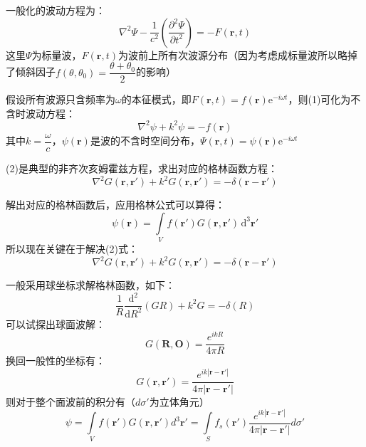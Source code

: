 \documentclass[10pt]{beamer}
\renewcommand{\bm}{\symbf}
\newenvironment{slide}{
    \begin{frame}{\bfseries{\sectiontitle}}
}{
    \end{frame}
}
\begin{document}
\begin{slide}
    一般化的波动方程为：
    \begin{equation}
        \nabla^2 \varPsi - \frac{1}{c^2}\left(\frac{\partial^2 \varPsi}{\partial t^2}\right) = -F(\bm{r},t)
    \end{equation}
    这里$\varPsi$为标量波，$F(\bm{r},t)$为波前上所有次波源分布（因为考虑成标量波所以略掉了倾斜因子$f(\theta,\theta_0)=\dfrac{\theta+\theta_0}{2}$的影响）

    假设所有波源只含频率为$\omega$的本征模式，即$F(\bm{r},t)=f(\bm{r})\mathrm{e}^{-i\omega t}$，则(1)可化为不含时波动方程：
    \begin{equation}
        \nabla^2 \psi + k^2 \psi = -f(\bm{r})
    \end{equation}
    其中$k=\dfrac{\omega}{c}$，$\psi(\bm{r})$是波的不含时空间分布，$\varPsi(\bm{r},t)=\psi(\bm{r})\mathrm{e}^{-i\omega t}$
\end{slide}

\begin{slide}
    (2)是典型的非齐次亥姆霍兹方程，求出对应的格林函数方程：
    \begin{equation}
        \nabla^2 G(\bm{r},\bm{r}') + k^2 G(\bm{r},\bm{r}') = -\delta(\bm{r}-\bm{r}')
    \end{equation}

    解出对应的格林函数后，应用格林公式可以算得：
    \begin{equation}
        \psi(\bm{r}) = \int\limits_{V} f(\bm{r}')G(\bm{r},\bm{r}')\,\mathrm{d}^3\bm{r}'
    \end{equation}
    所以现在关键在于解决(2)式：
    \begin{equation*}
        \nabla^2 G(\bm{r},\bm{r}') + k^2 G(\bm{r},\bm{r}') = -\delta(\bm{r}-\bm{r}')
    \end{equation*}
\end{slide}

\begin{slide}
    一般采用球坐标求解格林函数，如下：
    \begin{equation}
        \frac{1}{R} \frac{\mathrm{d}^2}{\mathrm{d} R^2} (GR) +k^2 G
        = -\delta(R)
    \end{equation}
    可以试探出球面波解：
    \begin{equation}
        G(\bm{R},\bm{O}) = \frac{e^{ikR}}{4\pi R}
    \end{equation}
    换回一般性的坐标有：
    \begin{equation}
        G(\bm{r},\bm{r}') = \frac{e^{ik |\bm{r}-\bm{r}' | }}{4\pi |\bm{r}-\bm{r}' |}
    \end{equation}
    则对于整个面波前的积分有（$d\sigma'$为立体角元）
    \begin{equation}
        \psi= \int\limits_V f(\bm{r}')G(\bm{r},\bm{r}')d^3\bm{r}' = \int\limits_S f_s(\bm{r}')\frac{e^{i k |\bm{r}- \bm{r}'|}}{4\pi |\bm{r}-\bm{r}'|}d\sigma'
    \end{equation}
\end{slide}
\end{document}
